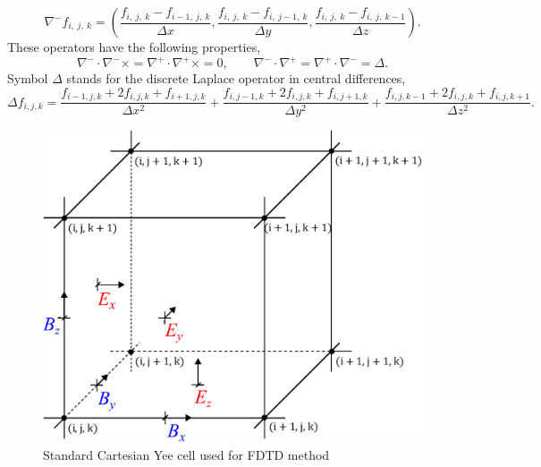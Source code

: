 \begin{equation}
\label{3.1.1.9}
\nabla^{-} f_{i,\: j,\: k} = \left(\frac{f_{i,\: j,\: k} - f_{i - 1,\: j,\: k}}{\Delta x}, \frac{f_{i,\: j,\: k} - f_{i,\: j - 1,\: k}}{\Delta y}, \frac{f_{i,\: j,\: k} - f_{i,\: j,\: k - 1}}{\Delta z} \right).
\end{equation}
These operators have the following properties,
\begin{equation}
\label{3.1.1.10}
\nabla^{-} \cdot \nabla^{-} \times = \nabla^{+} \cdot \nabla^{+} \times = 0, \qquad \nabla^{-} \cdot \nabla^{+} = \nabla^{+} \cdot \nabla^{-} = \Delta.
\end{equation}
Symbol $ \Delta $ stands for the discrete Laplace operator in central differences,
\begin{equation}
\label{3.1.1.11}
\Delta f_{i, j, k} = \frac{f_{i - 1, j, k} + 2 f_{i, j, k} + f_{i + 1, j, k}}{\Delta x^{2}} + \frac{f_{i, j - 1, k} + 2 f_{i, j, k} + f_{i, j + 1, k}}{\Delta y^{2}} + \frac{f_{i, j, k - 1} + 2 f_{i, j, k} + f_{i, j, k + 1}}{\Delta z^{2}}.
\end{equation}
\begin{figure}[h!]
\centering
\includegraphics[width=0.4\paperwidth]{./img/YEE/yee.eps}
\caption{Standard Cartesian Yee cell used for FDTD method}
\label{3.1.1.14}
\end{figure}

